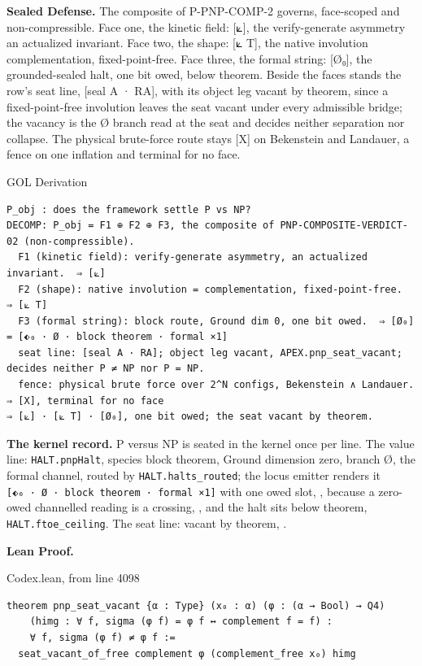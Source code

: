\documentclass[10pt,twocolumn]{article}
\begin{document}
\textbf{Sealed Defense.} The composite of P-PNP-COMP-2 governs,
face-scoped and non-compressible. Face one, the kinetic field: {[}⟀{]},
the verify-generate asymmetry an actualized invariant. Face two, the
shape: {[}⟀ T{]}, the native involution complementation,
fixed-point-free. Face three, the formal string: {[}Ø₀{]}, the
grounded-sealed halt, one bit owed, below theorem. Beside the faces
stands the row's seat line, {[}seal A · RA{]}, with its object leg
vacant by theorem, since a fixed-point-free involution leaves the seat
vacant under every admissible bridge; the vacancy is the Ø branch read
at the seat and decides neither separation nor collapse. The physical
brute-force route stays {[}X{]} on Bekenstein and Landauer, a fence on
one inflation and terminal for no face.

\begin{golbox}{GOL Derivation}
\begin{lstlisting}[style=golv]
P_obj : does the framework settle P vs NP?
DECOMP: P_obj = F1 ⊕ F2 ⊕ F3, the composite of PNP-COMPOSITE-VERDICT-02 (non-compressible).
  F1 (kinetic field): verify-generate asymmetry, an actualized invariant.  ⇒ [⟀]
  F2 (shape): native involution = complementation, fixed-point-free.  ⇒ [⟀ T]
  F3 (formal string): block route, Ground dim 0, one bit owed.  ⇒ [Ø₀] = [⬖₀ · Ø · block theorem · formal ×1]
  seat line: [seal A · RA]; object leg vacant, APEX.pnp_seat_vacant; decides neither P ≠ NP nor P = NP.
  fence: physical brute force over 2^N configs, Bekenstein ∧ Landauer.  ⇒ [X], terminal for no face
⇒ [⟀] · [⟀ T] · [Ø₀], one bit owed; the seat vacant by theorem.
\end{lstlisting}
\end{golbox}

\textbf{The kernel record.} P versus NP is seated in the kernel once per
line. The value line: \texttt{HALT.pnpHalt}, species block theorem,
Ground dimension zero, branch Ø, the formal channel, routed by
\texttt{HALT.halts\_routed}; the locus emitter renders it
\texttt{{[}⬖₀\ ·\ Ø\ ·\ block\ theorem\ ·\ formal\ ×1{]}} with one owed
slot, \texttt{}, because a zero-owed
channelled reading is a crossing,
\texttt{},
and the halt sits below theorem, \texttt{HALT.ftoe\_ceiling}. The seat
line: vacant by theorem, \texttt{}.

\textbf{Lean Proof.}

\begin{leanexcerpt}{Codex.lean, from line 4098}
\begin{lstlisting}[style=leanx,firstnumber=4098]
theorem pnp_seat_vacant {α : Type} (x₀ : α) (φ : (α → Bool) → Q4)
    (himg : ∀ f, sigma (φ f) = φ f ↔ complement f = f) :
    ∀ f, sigma (φ f) ≠ φ f :=
  seat_vacant_of_free complement φ (complement_free x₀) himg
\end{lstlisting}
\end{leanexcerpt}
\end{document}
